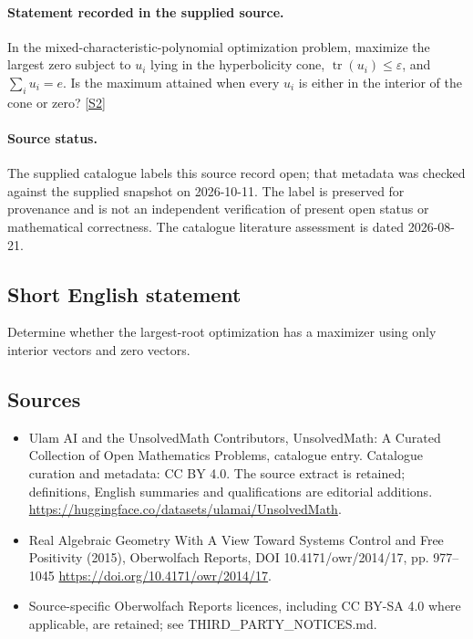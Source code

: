 \documentclass[11pt]{article}
\begin{document}
\paragraph{Statement recorded in the supplied source.}
In the mixed-characteristic-polynomial optimization problem, maximize the largest zero subject to $u_i$ lying in the hyperbolicity cone, $\operatorname{tr}(u_i)\leq\varepsilon$, and $\sum_i u_i=e$. Is the maximum attained when every $u_i$ is either in the interior of the cone or zero? \href{https://doi.org/10.4171/owr/2014/17}{[S2]}
\paragraph{Source status.}
The supplied catalogue labels this source record open; that metadata was checked against the supplied snapshot on 2026-10-11. The label is preserved for provenance and is not an independent verification of present open status or mathematical correctness. The catalogue literature assessment is dated 2026-08-21.
\subsection{Short English statement}
Determine whether the largest-root optimization has a maximizer using only interior vectors and zero vectors.
\subsection{Sources}
\begin{itemize}
\item[S1] Ulam AI and the UnsolvedMath Contributors, UnsolvedMath: A Curated Collection of Open Mathematics Problems, catalogue entry. Catalogue curation and metadata: CC BY 4.0. The source extract is retained; definitions, English summaries and qualifications are editorial additions.
\url{https://huggingface.co/datasets/ulamai/UnsolvedMath}.
\item[S2] Real Algebraic Geometry With A View Toward Systems Control and Free Positivity (2015), Oberwolfach Reports, DOI 10.4171/owr/2014/17, pp. 977--1045
\url{https://doi.org/10.4171/owr/2014/17}.
\item Source-specific Oberwolfach Reports licences, including CC BY-SA 4.0 where applicable, are retained; see THIRD\_PARTY\_NOTICES.md.
\end{itemize}
\end{document}
